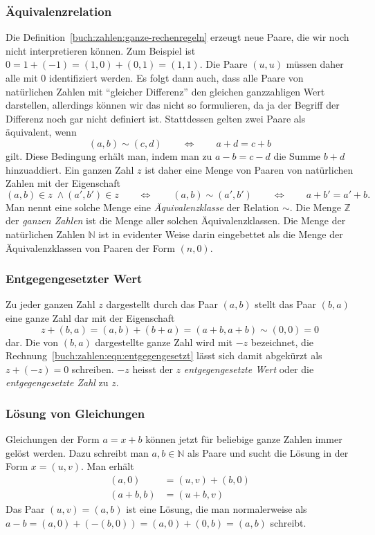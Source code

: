 \subsubsection{Äquivalenzrelation}
Die Definition~\eqref{buch:zahlen:ganze-rechenregeln}
erzeugt neue Paare, die wir noch nicht interpretieren können.
Zum Beispiel ist $0=1+(-1) = (1,0) + (0,1) = (1,1)$.
Die Paare $(u,u)$ müssen daher alle mit $0$ identifiziert werden.
Es folgt dann auch, dass alle Paare von natürlichen Zahlen mit 
``gleicher Differenz'' den gleichen ganzzahligen Wert darstellen,
allerdings können wir das nicht so formulieren, da ja der Begriff
der Differenz noch gar nicht definiert ist.
Stattdessen gelten zwei Paare als äquivalent, wenn
\begin{equation}
(a,b) \sim (c,d)
\qquad\Leftrightarrow\qquad
a+d = c+b
\label{buch:zahlen:ganz-aquivalenz}
\end{equation}
gilt.
Diese Bedingung erhält man, indem man zu $a-b=c-d$ die Summe $b+d$ 
hinzuaddiert.
Ein ganzen Zahl $z$ ist daher eine Menge von Paaren von natürlichen
Zahlen mit der Eigenschaft
\[
(a,b)\in z\;\wedge (a',b')\in z
\qquad\Leftrightarrow\qquad
(a,b)\sim(a',b')
\qquad\Leftrightarrow\qquad
a+b' = a'+b.
\]
Man nennt eine solche Menge eine {\em Äquivalenzklasse} der Relation $\sim$.
Die Menge $\mathbb{Z}$ der {\em ganzen Zahlen} ist die Menge aller solchen
%
Äquivalenzklassen.
Die Menge der natürlichen Zahlen $\mathbb{N}$ ist in evidenter Weise
darin eingebettet als die Menge der Äquivalenzklassen von Paaren der
Form $(n,0)$.

\subsubsection{Entgegengesetzter Wert}
Zu jeder ganzen Zahl $z$ dargestellt durch das Paar $(a,b)$ 
stellt das Paar $(b,a)$ eine ganze Zahl dar mit der Eigenschaft
\begin{equation}
z+(b,a)
=
(a,b) + (b+a) = (a+b,a+b) \sim (0,0) = 0
\label{buch:zahlen:eqn:entgegengesetzt}
\end{equation}
dar.
Die von $(b,a)$ dargestellte ganze Zahl wird mit $-z$ bezeichnet,
die Rechnung~\eqref{buch:zahlen:eqn:entgegengesetzt} lässt sich damit
abgekürzt als $z+(-z)=0$ schreiben.
$-z$ heisst der $z$ {\em entgegengesetzte Wert} oder die
%
{\em entgegengesetzte Zahl} zu $z$.

\subsubsection{Lösung von Gleichungen}
Gleichungen der Form $a=x+b$ können jetzt für beliebige ganze Zahlen
immer gelöst werden.
Dazu schreibt man $a,b\in\mathbb{N}$ als Paare und sucht die
Lösung in der Form $x=(u,v)$.
Man erhält
\begin{align*}
(a,0) &= (u,v) + (b,0)
\\
(a+b,b) &= (u+b,v)
\end{align*}
Das Paar $(u,v) = (a,b)$ ist eine Lösung, die man normalerweise als
$a-b = (a,0) + (-(b,0)) = (a,0) + (0,b) = (a,b)$ schreibt.

